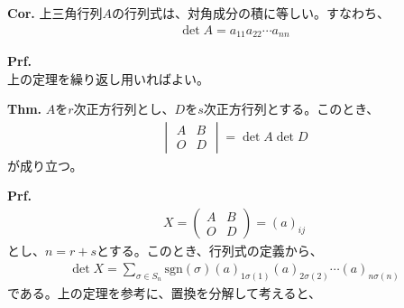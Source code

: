 \documentclass[a4paper,11pt]{jsarticle}
\numberwithin{equation}{section}
\begin{document}
\begin{itembox}[l]{\textbf{Cor.}}
  上三角行列$A$の行列式は、対角成分の積に等しい。すなわち、
  \begin{align}
    \det A = a_{11}a_{22}\cdots a_{nn}
  \end{align}
\end{itembox}
\textbf{Prf.}\\
上の定理を繰り返し用いればよい。\hfill\qedsymbol\\

\begin{itembox}[l]{\textbf{Thm.}}
  $A$を$r$次正方行列とし、$D$を$s$次正方行列とする。このとき、
  \begin{align}
    \begin{vmatrix}
      A & B\\
      O & D
    \end{vmatrix}
    = \det A \det D
  \end{align}
  が成り立つ。
\end{itembox}
\textbf{Prf.}\\
\begin{align}
X = \begin{pmatrix}
  A & B\\
  O & D
  \end{pmatrix}
  =
  (a)_{ij}
\end{align}
とし、$n=r+s$とする。このとき、行列式の定義から、
\begin{align}
  \det X = \sum_{\sigma \in S_n} \text{sgn}(\sigma) (a)_{1\sigma(1)}(a)_{2\sigma(2)}\cdots (a)_{n\sigma(n)}
\end{align}
である。上の定理を参考に、置換を分解して考えると、%
\end{document}
